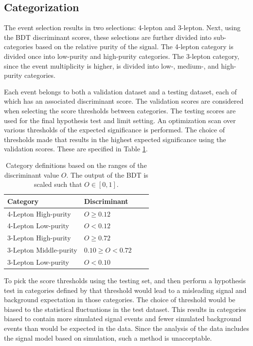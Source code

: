 \subsection{Categorization}

The event selection results in two selections: 4-lepton and 3-lepton.
Next, using the BDT discriminant scores, these selections are further divided into sub-categories based on the relative purity of the signal.
The 4-lepton category is divided once into low-purity and high-purity categories.
The 3-lepton category, since the event multiplicity is higher, is divided into low-, medium-, and high-purity categories.

Each event belongs to both a validation dataset and a testing dataset, each of which has an associated discriminant score.
The validation scores are considered when selecting the score thresholds between categories.
The testing scores are used for the final hypothesis test and limit setting.
An optimization scan over various thresholds of the expected significance is performed.
The choice of thresholds made that results in the highest expected significance using the validation scores.
These are specified in Table \ref{tab:hmmBdtCuts}.

\begin{table}[htp]
\begin{center}
\begin{tabular}{l l l l}
\toprule
Category & Discriminant \\
\midrule
4-Lepton High-purity & $O\ge0.12$ \\
4-Lepton Low-purity & $O<0.12$ \\
3-Lepton High-purity & $O\ge0.72$ \\
3-Lepton Middle-purity & $0.10\ge O<0.72$ \\
3-Lepton Low-purity & $O<0.10$ \\
\bottomrule
\end{tabular}
\caption{Category definitions based on the ranges of the discriminant value $O$. The output of the BDT is scaled such that $O\in[0,1]$.}
\label{tab:hmmBdtCuts}
\end{center}
\end{table}

To pick the score thresholds using the testing set, and then perform a hypothesis test in categories defined by that threshold would lead to a misleading signal and background expectation in those categories.
The choice of threshold would be biased to the statistical fluctuations in the test dataset.
This results in categories biased to contain more simulated signal events and fewer simulated background events than would be expected in the data.
Since the analysis of the data includes the signal model based on simulation, such a method is unacceptable.

